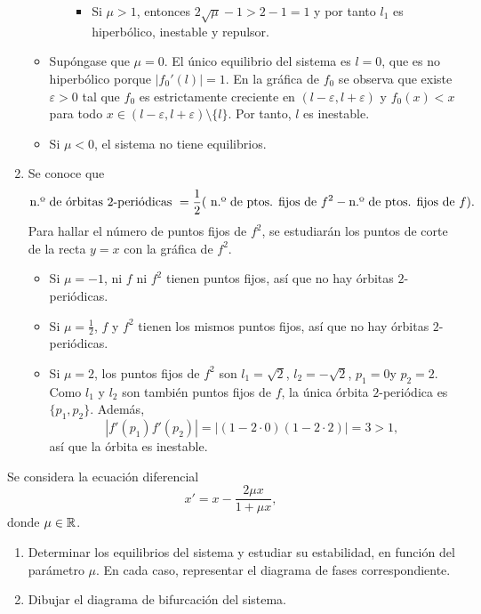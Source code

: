 \documentclass[11pt]{report}
\begin{document}
\begin{solution}
\begin{enumerate}
\begin{itemize}
\begin{itemize}
\begin{itemize}
                    \item Si $\mu > 1$, entonces $2\sqrt{\mu}-1 > 2-1 = 1$ y por tanto $l_1$ es hiperbólico, inestable y repulsor.
                \end{itemize}
            \end{itemize}
            \item Supóngase que $\mu = 0$. El único equilibrio del sistema es $l = 0$, que es no hiperbólico porque $|f_0'(l)| = 1$. En la gráfica de $f_0$ se observa que existe $\varepsilon>0$ tal que $f_0$ es estrictamente creciente en $(l-\varepsilon,l+\varepsilon)$ y $f_0(x) < x$ para todo $x \in (l-\varepsilon,l+\varepsilon) \setminus \{l\}$. Por tanto, $l$ es inestable.
            \item Si $\mu < 0$, el sistema no tiene equilibrios.
        \end{itemize}
        \item Se conoce que
        \[\textup{n.º de órbitas } 2 \textup{-periódicas } = \frac{1}{2}(\textup{ n.º de ptos. fijos de } f^2 - \textup{n.º de ptos. fijos de } f).\]
        Para hallar el número de puntos fijos de $f^2$, se estudiarán los puntos de corte de la recta $y = x$ con la gráfica de $f^2$.
        \begin{itemize}
            \item Si $\mu = -1$, ni $f$ ni $f^2$ tienen puntos fijos, así que no hay órbitas $2$-periódicas.
            \item Si $\mu = \frac{1}{2}$, $f$ y $f^2$ tienen los mismos puntos fijos, así que no hay órbitas $2$-periódicas.
            \item Si $\mu = 2$, los puntos fijos de $f^2$ son $l_1 = \sqrt{2}$, $l_2 = -\sqrt{2}$, $p_1  =0$y $p_2 = 2$. Como $l_1$ y $l_2$ son también puntos fijos de $f$, la única órbita $2$-periódica es $\{p_1,p_2\}$. Además,
            \[|f'(p_1)f'(p_2)| = |(1-2\cdot 0)(1-2\cdot 2)| = 3 > 1,\]
            así que la órbita es inestable.
        \end{itemize}
    \end{enumerate}
\end{solution}

\begin{exercise}[Junio de 2023]
    Se considera la ecuación diferencial
    \[x' = x-\frac{2\mu x}{1+\mu x},\]
    donde $\mu\in\mathbb R$.
    \begin{enumerate}
        \item Determinar los equilibrios del sistema y estudiar su estabilidad, en función del parámetro $\mu$. En cada caso, representar el diagrama de fases correspondiente.
        \item Dibujar el diagrama de bifurcación del sistema.
    \end{enumerate}
\end{exercise}
\end{document}
